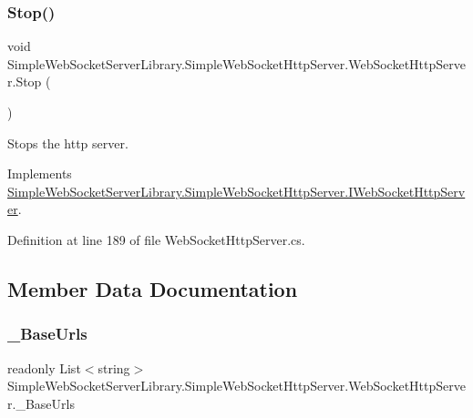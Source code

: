 \subsubsection{\texorpdfstring{Stop()}{Stop()}}
{\footnotesize\ttfamily void Simple\+Web\+Socket\+Server\+Library.\+Simple\+Web\+Socket\+Http\+Server.\+Web\+Socket\+Http\+Server.\+Stop (\begin{DoxyParamCaption}{ }\end{DoxyParamCaption})}



Stops the http server. 



Implements \mbox{\hyperlink{interface_simple_web_socket_server_library_1_1_simple_web_socket_http_server_1_1_i_web_socket_http_server_a73208116838cad69e1a7198ccfc89bbf}{Simple\+Web\+Socket\+Server\+Library.\+Simple\+Web\+Socket\+Http\+Server.\+I\+Web\+Socket\+Http\+Server}}.



Definition at line 189 of file Web\+Socket\+Http\+Server.\+cs.



\subsection{Member Data Documentation}
\mbox{\label{class_simple_web_socket_server_library_1_1_simple_web_socket_http_server_1_1_web_socket_http_server_a70e5c60e525049aed662d4f174413f43}} 
\subsubsection{\texorpdfstring{\+\_\+\+Base\+Urls}{\_BaseUrls}}
{\footnotesize\ttfamily readonly List$<$string$>$ Simple\+Web\+Socket\+Server\+Library.\+Simple\+Web\+Socket\+Http\+Server.\+Web\+Socket\+Http\+Server.\+\_\+\+Base\+Urls\hspace{0.3cm}{\ttfamily [private]}}




